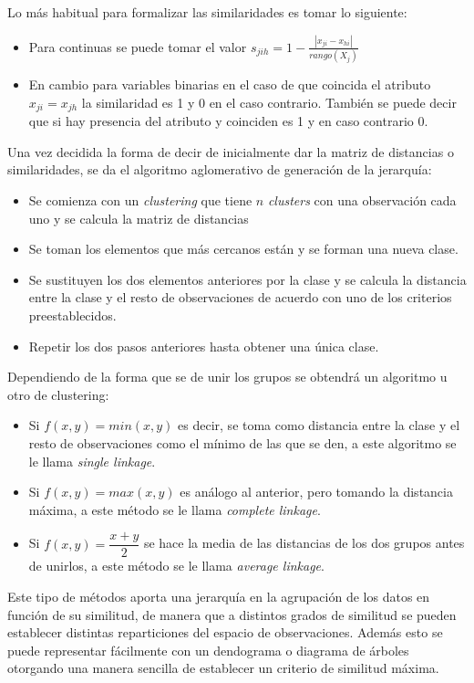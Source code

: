\noindent Lo más habitual para formalizar las similaridades es tomar lo siguiente:
\begin{itemize}
\item Para continuas se puede tomar el valor $s_{jih}=1-\frac{|x_{ji}-x_{hi}|}{rango(X_j)}$
\item En cambio para variables binarias en el caso de que coincida el atributo $x_{ji}=x_{jh}$ la similaridad es 1 y 0 en el caso contrario. También se puede decir que si hay presencia del atributo y coinciden es 1 y en caso contrario 0. 
\end{itemize}

\noindent Una vez decidida la forma de decir de inicialmente dar la matriz de distancias o similaridades, se da el algoritmo aglomerativo de generación de la jerarquía:
\begin{itemize}
\item Se comienza con un \emph{clustering} que tiene $n$ \emph{clusters} con una observación cada uno y se calcula la matriz de distancias
\item Se toman los elementos que más cercanos están y se forman una nueva clase.
\item Se sustituyen los dos elementos anteriores por la clase y se calcula la distancia entre la clase y el resto de observaciones de acuerdo con uno de los criterios preestablecidos. 
\item Repetir los dos pasos anteriores hasta obtener una única clase. 
\end{itemize}

\noindent Dependiendo de la forma que se de unir los grupos se obtendrá un algoritmo u otro de clustering:
\begin{itemize}
\item Si $f(x,y)=min(x,y)$ es decir, se toma como distancia entre la clase y el resto de observaciones como el mínimo de las que se den, a este algoritmo se le llama \textit{single linkage}.
\item  Si $f(x,y)=max(x,y)$ es análogo al anterior, pero tomando la distancia máxima, a este método se le llama \textit{complete linkage}.
\item  Si $f(x,y)=\dfrac{x+y}{2}$ se hace la media de las distancias de los dos grupos antes de unirlos, a este método se le llama \textit{average linkage}.
\end{itemize}

\noindent Este tipo de métodos aporta una jerarquía en la agrupación de los datos en función de su similitud, de manera que a distintos grados de similitud se pueden establecer distintas reparticiones del espacio de observaciones. Además esto se puede representar fácilmente con un dendograma o diagrama de árboles otorgando una manera sencilla de establecer un criterio de similitud máxima. 

